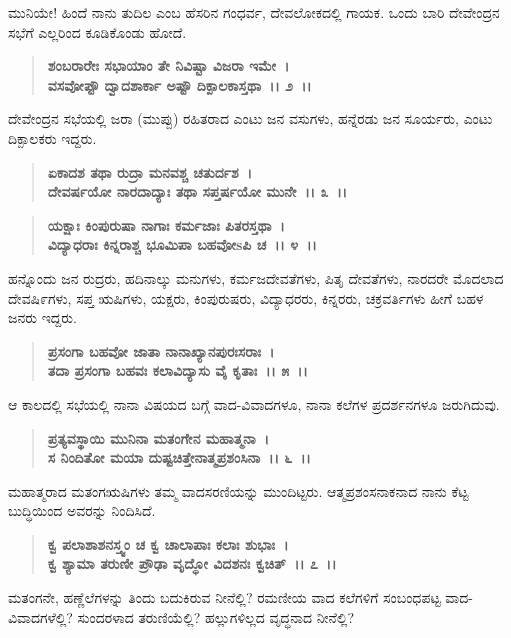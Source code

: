 ಮುನಿಯೇ! ಹಿಂದೆ ನಾನು ತುದಿಲ ಎಂಬ ಹೆಸರಿನ ಗಂಧರ್ವ, ದೇವಲೋಕದಲ್ಲಿ ಗಾಯಕ. ಒಂದು ಬಾರಿ ದೇವೇಂದ್ರನ ಸಭೆಗೆ ಎಲ್ಲರಿಂದ ಕೂಡಿಕೊಂಡು ಹೋದೆ.

\begin{verse}
\textbf{ಶಂಬರಾರೇಃ ಸಭಾಯಾಂ ತೇ ನಿವಿಷ್ಟಾ ವಿಜರಾ ಇಮೇ~।}\\\textbf{ವಸವೋಪ್ಟೌ ದ್ವಾದಶಾರ್ಕಾ ಅಷ್ಟೌ ದಿಕ್ಪಾಲಕಾಸ್ತಥಾ~।। ೨~।। }
\end{verse}

ದೇವೇಂದ್ರನ ಸಭೆಯಲ್ಲಿ ಜರಾ (ಮುಪ್ಪು) ರಹಿತರಾದ ಎಂಟು ಜನ ವಸುಗಳು, ಹನ್ನೆರಡು ಜನ ಸೂರ್ಯರು, ಎಂಟು ದಿಕ್ಪಾಲಕರು ಇದ್ದರು.

\begin{verse}
\textbf{ಏಕಾದಶ ತಥಾ ರುದ್ರಾ ಮನವಶ್ಚ ಚತುರ್ದಶ~।}\\\textbf{ದೇವರ್ಷಯೋ ನಾರದಾದ್ಯಾಃ ತಥಾ ಸಪ್ತರ್ಷಯೋ ಮುನೇ~।। ೩~।। }
\end{verse}

\begin{verse}
\textbf{ಯಕ್ಷಾಃ ಕಿಂಪುರುಷಾ ನಾಗಾಃ ಕರ್ಮಜಾಃ ಪಿತರಸ್ತಥಾ~।}\\\textbf{ವಿದ್ಯಾಧರಾಃ ಕಿನ್ನರಾಶ್ಚ ಭೂಮಿಪಾ ಬಹವೋsಪಿ ಚ~।। ೪~।। }
\end{verse}

ಹನ್ನೊಂದು ಜನ ರುದ್ರರು, ಹದಿನಾಲ್ಕು ಮನುಗಳು, ಕರ್ಮಜದೇವತೆಗಳು, ಪಿತೃ ದೇವತೆಗಳು, ನಾರದರೇ ಮೊದಲಾದ ದೇವಷಿ೯ಗಳು, ಸಪ್ತ ಋಷಿಗಳು, ಯಕ್ಷರು, ಕಿಂಪುರುಷರು, ವಿದ್ಯಾಧರರು, ಕಿನ್ನರರು, ಚಕ್ರವರ್ತಿಗಳು ಹೀಗೆ ಬಹಳ ಜನರು ಇದ್ದರು.

\begin{verse}
\textbf{ಪ್ರಸಂಗಾ ಬಹವೋ ಜಾತಾ ನಾನಾಖ್ಯಾನಪುರಃಸರಾಃ~।}\\\textbf{ತದಾ ಪ್ರಸಂಗಾ ಬಹವಃ ಕಲಾವಿದ್ಯಾಸು ವೈ ಕೃತಾಃ~।। ೫~।।} 
\end{verse}

ಆ ಕಾಲದಲ್ಲಿ ಸಭೆಯಲ್ಲಿ ನಾನಾ ವಿಷಯದ ಬಗ್ಗೆ ವಾದ-ವಿವಾದಗಳೂ, ನಾನಾ ಕಲೆಗಳ ಪ್ರದರ್ಶನಗಳೂ ಜರುಗಿದುವು.

\begin{verse}
\textbf{ಪ್ರತ್ಯವಸ್ಥಾಯಿ ಮುನಿನಾ ಮತಂಗೇನ ಮಹಾತ್ಮನಾ~।}\\\textbf{ಸ ನಿಂದಿತೋ ಮಯಾ ದುಷ್ಟಚಿತ್ತೇನಾತ್ಮಪ್ರಶಂಸಿನಾ~।। ೬~।। }
\end{verse}

ಮಹಾತ್ಮರಾದ ಮತಂಗಋಷಿಗಳು ತಮ್ಮ ವಾದಸರಣಿಯನ್ನು ಮುಂದಿಟ್ಟರು. ಆತ್ಮಪ್ರಶಂಸ\-ನಾಕನಾದ ನಾನು ಕೆಟ್ಟ ಬುದ್ಧಿಯಿಂದ ಅವರನ್ನು ನಿಂದಿಸಿದೆ.

\begin{verse}
\textbf{ಕ್ವ ಪಲಾಶಾಶನಸ್ತ್ವಂ ಚ ಕ್ವ ಚಾಲಾಪಾಃ ಕಲಾಃ ಶುಭಾಃ~।}\\\textbf{ಕ್ವ ಶ್ಯಾಮಾ ತರುಣೀ ಪ್ರೌಢಾ ವೃದ್ಧೋ ವಿದಶನಃ ಕ್ವಚಿತ್~।। ೭~।। }
\end{verse}

ಮತಂಗನೇ, ಹಣ್ಣೆಲೆಗಳನ್ನು ತಿಂದು ಬದುಕಿರುವ ನೀನೆಲ್ಲಿ? ರಮಣೀಯ ವಾದ ಕಲೆಗಳಿಗೆ ಸಂಬಂಧಪಟ್ಟ ವಾದ-ವಿವಾದಗಳೆಲ್ಲಿ? ಸುಂದರಳಾದ ತರುಣಿಯೆಲ್ಲಿ? ಹಲ್ಲುಗಳಿಲ್ಲದ ವೃದ್ಧನಾದ ನೀನೆಲ್ಲಿ?

